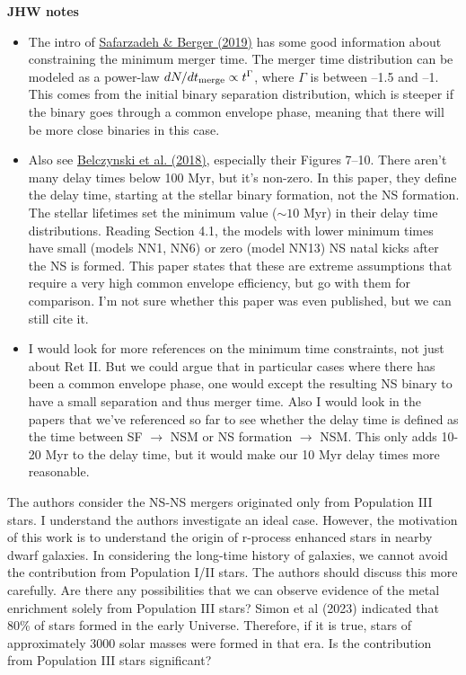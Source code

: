 \documentclass[11pt]{article}
\begin{document}
\noindent\textbf{JHW notes}
\begin{itemize}
  \item The intro of \href{https://ui.adsabs.harvard.edu/abs/2019ApJ...878L..12S/abstract}{Safarzadeh \& Berger (2019)} has some good information about constraining the minimum merger time.  The merger time distribution can be modeled as a power-law $dN/dt_{\rm merge} \propto t^\Gamma$, where $\Gamma$ is between --1.5 and --1.  This comes from the initial binary separation distribution, which is steeper if the binary goes through a common envelope phase, meaning that there will be more close binaries in this case.
  \item Also see \href{https://arxiv.org/abs/1812.10065}{Belczynski et al. (2018)}, especially their Figures 7--10.  There aren't many delay times below 100 Myr, but it's non-zero.   In this paper, they define the delay time, starting at the stellar binary formation, not the NS formation.  The stellar lifetimes set the minimum value ($\sim 10$ Myr) in their delay time distributions.  Reading Section 4.1, the models with lower minimum times have small (models NN1, NN6) or zero (model NN13) NS natal kicks after the NS is formed.  This paper states that these are extreme assumptions that require a very high common envelope efficiency, but go with them for comparison.  I'm not sure whether this paper was even published, but we can still cite it.
  \item I would look for more references on the minimum time constraints, not just about Ret II.  But we could argue that in particular cases where there has been a common envelope phase, one would except the resulting NS binary to have a small separation and thus merger time.  Also I would look in the papers that we've referenced so far to see whether the delay time is defined as the time between SF $\rightarrow$ NSM or NS formation $\rightarrow$ NSM.  This only adds 10-20 Myr to the delay time, but it would make our 10 Myr delay times more reasonable.
\end{itemize}

\begin{tcolorbox}[colback={lightgray}]   
    The authors consider the NS-NS mergers originated only from Population III stars. I understand the authors investigate an ideal case. However, the motivation of this work is to understand the origin of r-process enhanced stars in nearby dwarf galaxies. In considering the long-time history of galaxies, we cannot avoid the contribution from Population I/II stars. The authors should discuss this more carefully. Are there any possibilities that we can observe evidence of the metal enrichment solely from Population III stars? Simon et al (2023) indicated that 80\% of stars formed in the early Universe. Therefore, if it is true, stars of approximately 3000 solar masses were formed in that era. Is the contribution from Population III stars significant?
\end{tcolorbox}
\end{document}
